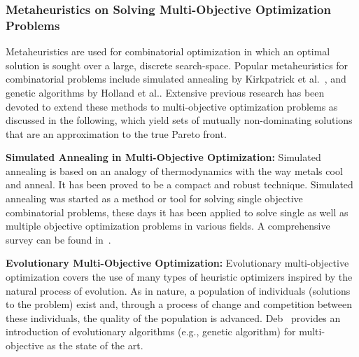 \subsubsection{Metaheuristics on Solving Multi-Objective Optimization Problems}
\label{metaheuristics}
Metaheuristics are used for combinatorial optimization in which an optimal solution is sought over a large, discrete search-space. Popular metaheuristics for combinatorial problems include simulated annealing by Kirkpatrick et al.~\cite{Kirkpatrick1987}, and genetic algorithms by Holland et al.\cite{Holland1992}. Extensive previous research has been devoted to extend these methods to multi-objective optimization problems as discussed in the following, which yield sets of mutually non-dominating solutions that are an approximation to the true Pareto front.

\textbf{Simulated Annealing in Multi-Objective Optimization:} Simulated annealing is based on an analogy of thermodynamics with the way metals cool and anneal. It has been proved to be a compact and robust technique. Simulated annealing was started as a method or tool for solving single objective combinatorial problems, these days it has been applied to solve single as well as multiple objective optimization problems in various fields. A comprehensive survey can be found in~\cite{SumanSurvey}.

\textbf{Evolutionary Multi-Objective Optimization:} Evolutionary multi-objective optimization covers the use of many types of heuristic optimizers inspired by the natural process of evolution. As in nature, a population of individuals (solutions to the problem) exist and, through a process of change and competition between these individuals, the quality of the population is advanced. Deb~\cite{Deb2001} provides an introduction of evolutionary algorithms (e.g., genetic algorithm) for multi-objective as the state of the art.

